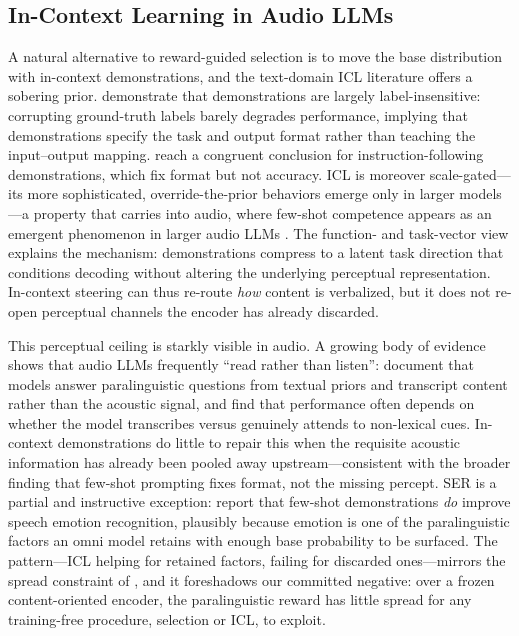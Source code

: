 \subsection{In-Context Learning in Audio LLMs}
\label{sec:rw-icl}

A natural alternative to reward-guided selection is to move the base distribution with in-context demonstrations, and the text-domain ICL literature offers a sobering prior. \citet{min2022rethinking} demonstrate that demonstrations are largely label-insensitive: corrupting ground-truth labels barely degrades performance, implying that demonstrations specify the task and output format rather than teaching the input--output mapping. \citet{alice2026} reach a congruent conclusion for instruction-following demonstrations, which fix format but not accuracy. ICL is moreover scale-gated---its more sophisticated, override-the-prior behaviors emerge only in larger models \citep{wei2023larger}---a property that carries into audio, where few-shot competence appears as an emergent phenomenon in larger audio LLMs \citep{mimoaudio2025}. The function- and task-vector view \citep{todd2024functionvectors,taskvectors2025} explains the mechanism: demonstrations compress to a latent task direction that conditions decoding without altering the underlying perceptual representation. In-context steering can thus re-route \emph{how} content is verbalized, but it does not re-open perceptual channels the encoder has already discarded.

This perceptual ceiling is starkly visible in audio. A growing body of evidence shows that audio LLMs frequently ``read rather than listen'': \citet{voxparadox2026} document that models answer paralinguistic questions from textual priors and transcript content rather than the acoustic signal, and \citet{listenortranscribe2025} find that performance often depends on whether the model transcribes versus genuinely attends to non-lexical cues. In-context demonstrations do little to repair this when the requisite acoustic information has already been pooled away upstream---consistent with the broader finding that few-shot prompting fixes format, not the missing percept. SER is a partial and instructive exception: \citet{sericl2025} report that few-shot demonstrations \emph{do} improve speech emotion recognition, plausibly because emotion is one of the paralinguistic factors an omni model retains with enough base probability to be surfaced. The pattern---ICL helping for retained factors, failing for discarded ones---mirrors the spread constraint of , and it foreshadows our committed negative: over a frozen content-oriented encoder, the paralinguistic reward has little spread for any training-free procedure, selection or ICL, to exploit.

